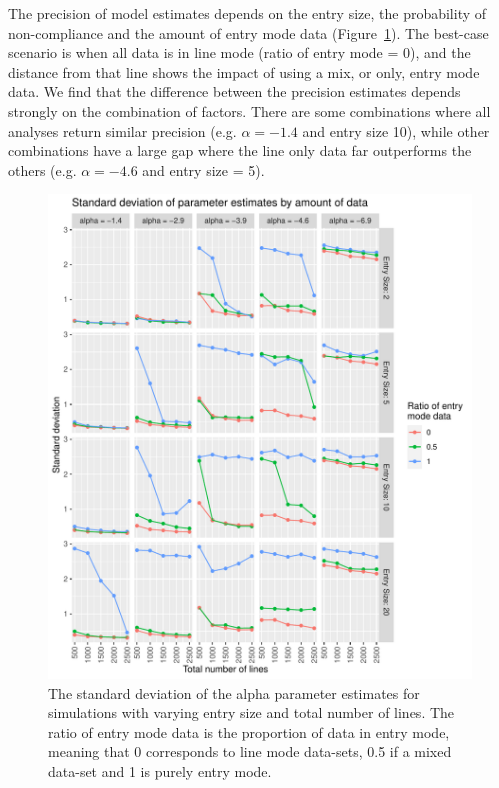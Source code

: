 \documentclass{article}
\begin{document}
The precision of model estimates depends on the entry size, the probability of non-compliance and the amount of entry mode data (Figure~\ref{fig:SD_est_simulated}). The best-case scenario is when all data is in line mode (ratio of entry mode = 0), and the distance from that line shows the impact of using a mix, or only, entry mode data. We find that the difference between the precision estimates depends strongly on the combination of factors. There are some combinations where all analyses return similar precision (e.g. \(\alpha=-1.4\) and entry size 10), while other combinations have a large gap where the line only data far outperforms the others (e.g. \(\alpha=-4.6\) and entry size = 5).


\begin{figure}[h!]
\includegraphics[width=\textwidth]{../visualisations/figures/sim_study_pint_vs_data_vs_entry_size.pdf}
\caption{The standard deviation of the alpha parameter estimates for simulations with varying entry size and total number of lines. The ratio of entry mode data is the proportion of data in entry mode, meaning that 0 corresponds to line mode data-sets, 0.5 if a mixed data-set and 1 is purely entry mode. }
\label{fig:SD_est_simulated}
\end{figure}
\end{document}
